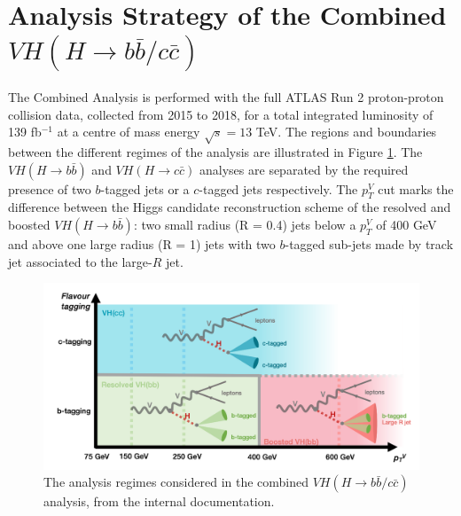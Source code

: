 \section{Analysis Strategy of the Combined $VH (H\rightarrow b\bar{b}/c\bar{c})$}
The Combined Analysis is performed with the full ATLAS Run 2 proton-proton collision data, collected from 2015 to 2018, for a total integrated luminosity of 139 fb$^{-1}$ at a centre of mass energy $\sqrt{s} = 13$ TeV. The regions and boundaries between the different regimes of the analysis are illustrated in Figure \ref{fig:ana-strat}. The $VH (H\rightarrow b\bar{b})$ and $VH (H\rightarrow c\bar{c})$ analyses are separated by the required presence of two $b$-tagged jets or a $c$-tagged jets respectively. The $p_T^V$ cut marks the difference between the Higgs candidate reconstruction scheme of the resolved and boosted $VH (H\rightarrow b\bar{b})$: two small radius (R = 0.4) jets below a $p_T^V$ of 400 GeV and above one large radius (R = 1) jets with two $b$-tagged sub-jets made by  track jet associated to the large-$R$ jet.

\begin{figure}[h!]
\center
\includegraphics[width=\textwidth]{Images/VH/Cat/AnalysisRegime.png}
\caption{The analysis regimes considered in the combined $VH (H\rightarrow b\bar{b}/c\bar{c})$ analysis, from the internal documentation.} 
\label{fig:ana-strat}
\end{figure}

